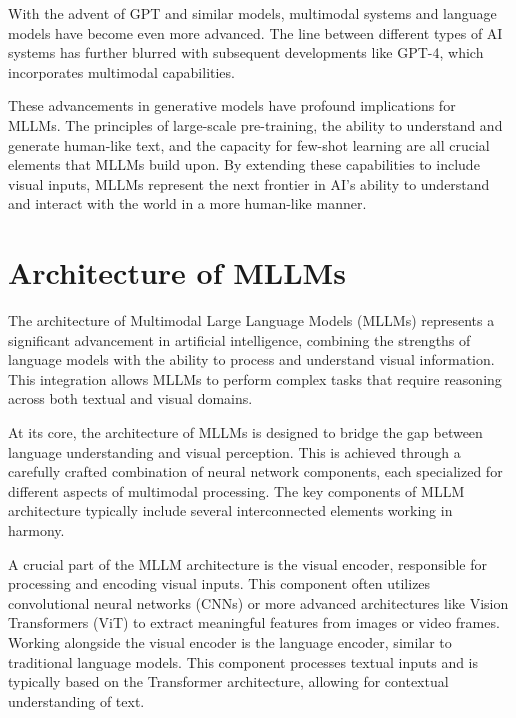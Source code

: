 With the advent of GPT and similar models, multimodal systems and language models have become even more advanced. The line between different types of AI systems has further blurred with subsequent developments like GPT-4, which incorporates multimodal capabilities.

These advancements in generative models have profound implications for MLLMs. The principles of large-scale pre-training, the ability to understand and generate human-like text, and the capacity for few-shot learning are all crucial elements that MLLMs build upon. By extending these capabilities to include visual inputs, MLLMs represent the next frontier in AI's ability to understand and interact with the world in a more human-like manner.

\section{Architecture of MLLMs}


The architecture of Multimodal Large Language Models (MLLMs) represents a significant advancement in artificial intelligence, combining the strengths of language models with the ability to process and understand visual information. This integration allows MLLMs to perform complex tasks that require reasoning across both textual and visual domains.

At its core, the architecture of MLLMs is designed to bridge the gap between language understanding and visual perception. This is achieved through a carefully crafted combination of neural network components, each specialized for different aspects of multimodal processing. The key components of MLLM architecture typically include several interconnected elements working in harmony.

A crucial part of the MLLM architecture is the visual encoder, responsible for processing and encoding visual inputs. This component often utilizes convolutional neural networks (CNNs) or more advanced architectures like Vision Transformers (ViT) to extract meaningful features from images or video frames. Working alongside the visual encoder is the language encoder, similar to traditional language models. This component processes textual inputs and is typically based on the Transformer architecture, allowing for contextual understanding of text.

